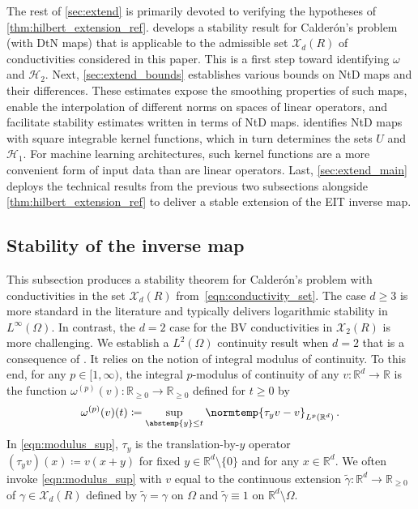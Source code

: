 \documentclass[pdflatex,sn-mathphys-num]{sn-jnl-preprint}
\newcommand{\R}{\mathbb{R}}
\newcommand{\cH}{\mathcal{H}}
\newcommand{\cX}{\mathcal{X}}
\newcommand{\norm}{\normtemp}
\newcommand{\abs}{\abstemp}
\newcommand{\defeq}{\coloneqq} %
\theoremstyle{thmstyleone}%
\theoremstyle{thmstyletwo}%
\theoremstyle{thmstylethree}%
\numberwithin{equation}{section}
\numberwithin{theorem}{section}
\begin{document}
The rest of \cref{sec:extend} is primarily devoted to verifying the hypotheses of \cref{thm:hilbert_extension_ref}.  develops a stability result for Calder\'on's problem (with DtN maps) that is applicable to the admissible set $\cX_d(R)$ of conductivities considered in this paper. This is a first step toward identifying $\omega$ and $\cH_2$. Next, \cref{sec:extend_bounds} establishes various bounds on NtD maps and their differences. These estimates expose the smoothing properties of such maps, enable the interpolation of different norms on spaces of linear operators, and facilitate stability estimates written in terms of NtD maps.  identifies NtD maps with square integrable kernel functions, which in turn determines the sets $U$ and $\cH_1$. For machine learning architectures, such kernel functions are a more convenient form of input data than are linear operators. Last, \cref{sec:extend_main} deploys the technical results from the previous two subsections alongside \cref{thm:hilbert_extension_ref} to deliver a stable extension of the EIT inverse map.

\subsection{Stability of the inverse map}\label{sec:extend_stability}
This subsection produces a stability theorem for Calder\'on's problem with conductivities in the set $\cX_d(R)$ from~\eqref{eqn:conductivity_set}. The case $d\geq 3$ is more standard in the literature and typically delivers logarithmic stability in $L^\infty(\Omega)$. In contrast, the $d=2$ case for the BV conductivities in $\cX_2(R)$ is more challenging. We establish a $L^2(\Omega)$ continuity result when $d=2$ that is a consequence of \cite[Thm.~1.6, pp.~5661--5662]{faraco2018characterization}. It relies on the notion of integral modulus of continuity. To this end, for any $p\in [1,\infty)$, the integral $p$-modulus of continuity of any $v\colon\R^d\to\R$ is the function $\omega^{(p)}(v)\colon \R_{\geq 0}\to\R_{\geq 0}$ defined for $t\geq 0$ by
\begin{align}\label{eqn:modulus_sup}
    \omega^{(p)}(v)(t)\defeq \sup_{\abs{y}\leq t}\norm{\tau_y v - v}_{L^p(\R^d)}\,.
\end{align}
In \eqref{eqn:modulus_sup}, $\tau_y$ is the translation-by-$y$ operator $(\tau_yv)(x)\defeq v(x+y)$ for fixed $y\in\R^d\setminus\{0\}$ and for any $x\in\R^d$. We often invoke \eqref{eqn:modulus_sup} with $v$ equal to the continuous extension $\widetilde{\gamma}\colon \R^d\to\R_{\geq 0}$ of $\gamma\in\cX_d(R)$ defined by $\widetilde{\gamma} = \gamma$ on $\Omega$ and $\widetilde{\gamma}\equiv 1$ on $\R^d\setminus\Omega$.
\end{document}
